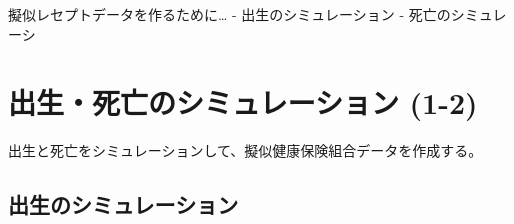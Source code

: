 \documentclass[
]{book}
\begin{document}
擬似レセプトデータを作るために\ldots{}
- 出生のシミュレーション
- 死亡のシミュレーシ

\hypertarget{ux51faux751fux6b7bux4ea1ux306eux30b7ux30dfux30e5ux30ecux30fcux30b7ux30e7ux30f3-1-2}{%
\chapter{出生・死亡のシミュレーション (1-2)}\label{ux51faux751fux6b7bux4ea1ux306eux30b7ux30dfux30e5ux30ecux30fcux30b7ux30e7ux30f3-1-2}}

出生と死亡をシミュレーションして、擬似健康保険組合データを作成する。

\hypertarget{ux51faux751fux306eux30b7ux30dfux30e5ux30ecux30fcux30b7ux30e7ux30f3}{%
\section{出生のシミュレーション}\label{ux51faux751fux306eux30b7ux30dfux30e5ux30ecux30fcux30b7ux30e7ux30f3}}

  
\end{document}
